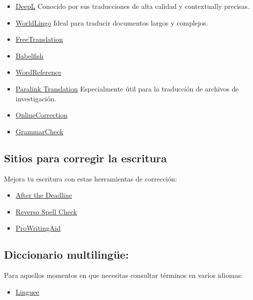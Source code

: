 \documentclass[
  jou,
  floatsintext,
  longtable,
  a4paper,
  nolmodern,
  notxfonts,
  notimes,
  12pt,
  colorlinks=true,linkcolor=blue,citecolor=blue,urlcolor=blue]{apa7}
\providecommand{\tightlist}{%
  \setlength{\itemsep}{0pt}\setlength{\parskip}{0pt}}
\begin{document}
\begin{itemize}
\tightlist
\item
  \href{https://www.deepl.com/es/home}{DeepL} Conocido por sus
  traducciones de alta calidad y contextually precisas.
\item
  \href{http://www.worldlingo.com/}{WorldLingo} Ideal para traducir
  documentos largos y complejos.
\item
  \href{https://www.freetranslation.com/}{FreeTranslation}
\item
  \href{https://www.babelfish.com/}{Babelfish}
\item
  \href{https://www.wordreference.com/}{WordReference}
\item
  \href{https://www.translation2.paralink.com/}{Paralink Translation}
  Especialmente útil para la traducción de archivos de investigación.
\item
  \href{https://www.onlinecorrection.com/}{OnlineCorrection}
\item
  \href{https://www.grammarcheck.net/}{GrammarCheck}
\end{itemize}

\subsection{Sitios para corregir la
escritura}\label{sitios-para-corregir-la-escritura}

Mejora tu escritura con estas herramientas de corrección:

\begin{itemize}
\tightlist
\item
  \href{http://www.afterthedeadline.com/}{After the Deadline}
\item
  \href{http://www.reverso.net/spell-chec/english-spelling-grammar/}{Reverso
  Spell Check}
\item
  \href{https://prowritingaid.com/}{ProWritingAid}
\end{itemize}

\subsection{Diccionario multilingüe:}\label{diccionario-multilinguxfce}

Para aquellos momentos en que necesitas consultar términos en varios
idiomas:

\begin{itemize}
\tightlist
\item
  \href{https://www.linguee.es/}{Linguee}
\end{itemize}
\end{document}
